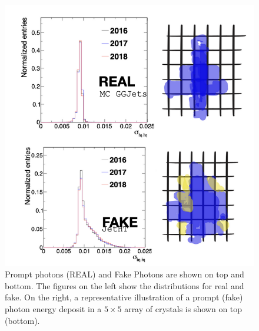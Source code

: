 \begin{figure}[!htb]
	\centering
	\includegraphics[scale=0.9]{fig/PromptPhotonsVsFakes.png}
	\caption{Prompt photons (REAL) and Fake Photons are shown on top and bottom. The figures on the left show the \sieie distributions for real and fake. On the right, a representative illustration of a prompt (fake) photon energy deposit in a $5 \times 5$ array of crystals is shown on top (bottom).}
	\label{fig:PromptPhotonsVsFakes}
\end{figure}

